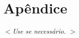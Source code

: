 \documentclass[12pt]{article}
\begin{document}
\section*{Apêndice}
\label{sec:apendice}

\textit{$<$Use se necessário. $>$}



\newpage

{}
\end{document}
